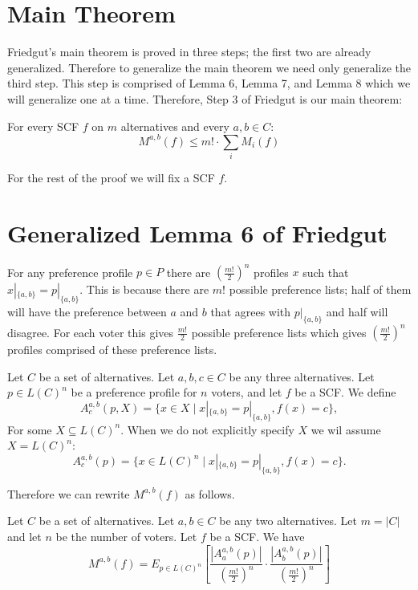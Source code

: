 \section{Main Theorem}

	Friedgut's main theorem is proved in three steps; the first two are already generalized. Therefore to generalize the main theorem we need only generalize the third step. This step is comprised of Lemma 6, Lemma 7, and Lemma 8 which we will generalize one at a time. Therefore, Step 3 of Friedgut is our main theorem:

	\begin{theorem}
		For every SCF $f$ on $m$ alternatives and every $a, b \in C$:
		\[
			M^{a, b}(f) \le m! \cdot \sum_i M_i(f)
		\]
	\end{theorem}

	For the rest of the proof we will fix a SCF $f$.


\section{Generalized Lemma 6 of Friedgut}

	For any preference profile $p \in P$ there are $(\frac{m!}{2})^n$ profiles $x$ such that $x|_{\{a, b\}} = p|_{\{a, b\}}$. This is because there are $m!$ possible preference lists; half of them will have the preference between $a$ and $b$ that agrees with $p|_{\{a, b\}}$ and half will disagree. For each voter this gives $\frac{m!}{2}$ possible preference lists which gives $(\frac{m!}{2})^n$ profiles comprised of these preference lists.

	\begin{definition}
		Let $C$ be a set of alternatives. Let $a, b, c \in C$ be any three alternatives. Let $p \in L(C)^n$ be a preference profile for $n$ voters, and let $f$ be a SCF. We define
		\[
			A^{a,b}_c(p, X) = \{x \in X \mid x|_{\{a,b\}} = p|_{\{a,b\}}, f(x) = c\},
		\]
		For some $X \subseteq L(C)^n$. When we do not explicitly specify $X$ we wil assume $X = L(C)^n$:
		\[
			A^{a,b}_c(p) = \{x \in L(C)^n \mid x|_{\{a,b\}} = p|_{\{a,b\}}, f(x) = c\}.
		\]
	\end{definition}

	Therefore we can rewrite $M^{a,b}(f)$ as follows.

	\begin{lemma}
		\label{friedgut-lemma-6}
		Let $C$ be a set of alternatives. Let $a, b \in C$ be any two alternatives. Let $m = |C|$ and let $n$ be the number of voters. Let $f$ be a SCF. We have
		\[
			M^{a,b}(f) = E_{p \in L(C)^n} \left[ \frac{|A^{a,b}_a(p)|}{\left(\frac{m!}{2}\right)^n} \cdot \frac{|A^{a,b}_b(p)|}{\left(\frac{m!}{2}\right)^n} \right]
		\]
	\end{lemma}

